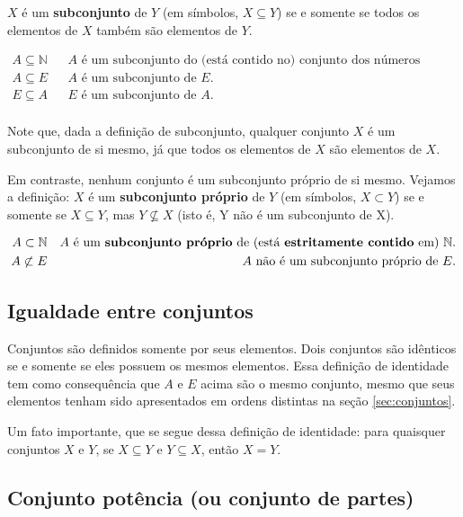 \documentclass[11pt]{article}
\begin{document}
\(X\) é um \textbf{subconjunto} de \(Y\) (em símbolos, \(X\subseteq Y\)) se e somente se todos os elementos de \(X\) também são elementos de \(Y\).

\begin{align*}
  A \subseteq \mathbb{N} & & A \text{ é um subconjunto do (está contido no) conjunto dos números naturais.}\\
  A \subseteq E & & A \text{ é um subconjunto de } E.\\
  E \subseteq A & & E \text{ é um subconjunto de } A.\\
\end{align*}

Note que, dada a definição de subconjunto, qualquer conjunto \(X\) é um subconjunto de si mesmo, já que todos os elementos de \(X\) são elementos de \(X\).

Em contraste, nenhum conjunto é um subconjunto próprio de si mesmo. Vejamos a definição: \(X\) é um \textbf{subconjunto próprio} de \(Y\) (em símbolos, \(X\subset Y\)) se e somente se \(X\subseteq Y\), mas \(Y\not\subseteq X\) (isto é, Y não é um subconjunto de X).

\begin{align*}
  A \subset \mathbb{N} & & A \text{ é um \textbf{subconjunto próprio} de (está \textbf{estritamente contido} em) } \mathbb{N}.\\
  A \not\subset E & & A \text{ não é um subconjunto próprio de } E.
\end{align*}

\subsection{Igualdade entre conjuntos}
\label{sec:igualdade}

Conjuntos são definidos somente por seus elementos. Dois conjuntos são idênticos se e somente se eles possuem os mesmos elementos. Essa definição de identidade tem como consequência que \(A\) e \(E\) acima são o mesmo conjunto, mesmo que seus elementos tenham sido apresentados em ordens distintas na seção \ref{sec:conjuntos}.

Um fato importante, que se segue dessa definição de identidade: para quaisquer conjuntos \(X\) e \(Y\), se \(X\subseteq Y\) e \(Y\subseteq X\), então \(X = Y\).

\subsection{Conjunto potência (ou conjunto de partes)}
\label{sec:conjunto-potencia}
\end{document}
